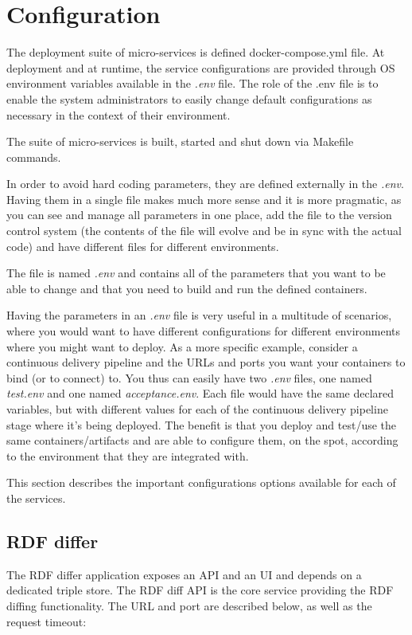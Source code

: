 \section{Configuration}
\label{sec:configuration}
The deployment suite of micro-services is defined docker-compose.yml file. At deployment and at runtime, the service configurations are provided through OS environment variables available in the \textit{.env} file. The role of the .env file is to enable the system administrators to easily change default configurations as necessary in the context of their environment.

The suite of micro-services is built, started and shut down via Makefile commands.

In order to avoid hard coding parameters, they are defined externally in the \textit{.env}. Having them in a single file makes much more sense and it is more pragmatic, as you can see and manage all parameters in one place, add the file to the version control system (the contents of the file will evolve and be in sync with the actual code) and have different files for different environments.

The file is named \textit{.env} and contains all of the parameters that you want to be able to change and that you need to build and run the defined containers. 

Having the parameters in an \textit{.env} file is very useful in a multitude of scenarios, where you would want to have different configurations for different environments where you might want to deploy. As a more specific example, consider a continuous delivery pipeline and the URLs and ports you want your containers to bind (or to connect) to. You thus can easily have two \textit{.env} files, one named \textit{test.env} and one named \textit{acceptance.env}. Each file would have the same declared variables, but with different values for each of the continuous delivery pipeline stage where it’s being deployed. The benefit is that you deploy and test/use the same containers/artifacts and are able to configure them, on the spot, according to the environment that they are integrated with.

This section describes the important configurations options available for each of the services.

\subsection{RDF differ}

The RDF differ application exposes an API and an UI and depends on a dedicated triple store. The RDF diff API is the core service providing the RDF diffing functionality. The URL and port are described below, as well as the request timeout:

